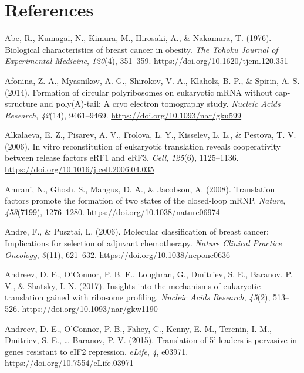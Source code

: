 \documentclass[12pt,openany]{book}
\begin{document}
\chapter*{References}\label{references}

\hypertarget{refs}{}
\hypertarget{ref-Abe1976}{}
Abe, R., Kumagai, N., Kimura, M., Hirosaki, A., \& Nakamura, T. (1976).
Biological characteristics of breast cancer in obesity. \emph{The Tohoku
Journal of Experimental Medicine}, \emph{120}(4), 351--359.
\url{https://doi.org/10.1620/tjem.120.351}

\hypertarget{ref-Afonina2014}{}
Afonina, Z. A., Myasnikov, A. G., Shirokov, V. A., Klaholz, B. P., \&
Spirin, A. S. (2014). Formation of circular polyribosomes on eukaryotic
mRNA without cap-structure and poly(A)-tail: A cryo electron tomography
study. \emph{Nucleic Acids Research}, \emph{42}(14), 9461--9469.
\url{https://doi.org/10.1093/nar/gku599}

\hypertarget{ref-Alkalaeva2006}{}
Alkalaeva, E. Z., Pisarev, A. V., Frolova, L. Y., Kisselev, L. L., \&
Pestova, T. V. (2006). In vitro reconstitution of eukaryotic translation
reveals cooperativity between release factors eRF1 and eRF3.
\emph{Cell}, \emph{125}(6), 1125--1136.
\url{https://doi.org/10.1016/j.cell.2006.04.035}

\hypertarget{ref-Amrani2008}{}
Amrani, N., Ghosh, S., Mangus, D. A., \& Jacobson, A. (2008).
Translation factors promote the formation of two states of the
closed-loop mRNP. \emph{Nature}, \emph{453}(7199), 1276--1280.
\url{https://doi.org/10.1038/nature06974}

\hypertarget{ref-Andre2006}{}
Andre, F., \& Pusztai, L. (2006). Molecular classification of breast
cancer: Implications for selection of adjuvant chemotherapy.
\emph{Nature Clinical Practice Oncology}, \emph{3}(11), 621--632.
\url{https://doi.org/10.1038/ncponc0636}

\hypertarget{ref-Andreev2017}{}
Andreev, D. E., O'Connor, P. B. F., Loughran, G., Dmitriev, S. E.,
Baranov, P. V., \& Shatsky, I. N. (2017). Insights into the mechanisms
of eukaryotic translation gained with ribosome profiling. \emph{Nucleic
Acids Research}, \emph{45}(2), 513--526.
\url{https://doi.org/10.1093/nar/gkw1190}

\hypertarget{ref-Andreev2015}{}
Andreev, D. E., O'Connor, P. B., Fahey, C., Kenny, E. M., Terenin, I.
M., Dmitriev, S. E., \ldots{} Baranov, P. V. (2015). Translation of 5'
leaders is pervasive in genes resistant to eIF2 repression.
\emph{eLife}, \emph{4}, e03971.
\url{https://doi.org/10.7554/eLife.03971}
\end{document}
